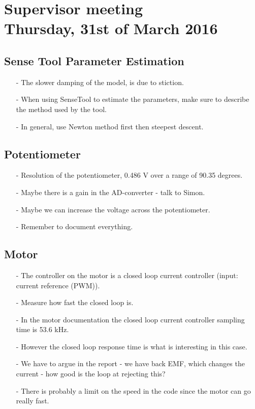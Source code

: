 

\renewcommand\chaptername{KAPITEL}
\renewcommand\contentsname{Indhold}
\renewcommand\figurename{Figur}
\renewcommand\tablename{Tabel}

\section*{Supervisor meeting\\ \small Thursday, 31st of March 2016}

\subsection{Sense Tool Parameter Estimation}
\begin{itemize}
  \item[-] The slower damping of the model, is due to stiction.
  \item[-] When using SenseTool to estimate the parameters, make sure to describe the method used by the tool.
  \item[-] In general, use Newton method first then steepest descent.
\end{itemize}

\subsection{Potentiometer}
\begin{itemize}
  \item[-] Resolution of the potentiometer, 0.486 V over a range of 90.35 degrees.
  \item[-] Maybe there is a gain in the AD-converter - talk to Simon.
  \item[-] Maybe we can increase the voltage across the potentiometer.
  \item[-] Remember to document everything.
\end{itemize}

\subsection{Motor}
\begin{itemize}
  \item[-] The controller on the motor is a closed loop current controller (input: current reference (PWM)).
  \item[-] Measure how fast the closed loop is.
  \item[-] In the motor documentation the closed loop current controller sampling time is 53.6 kHz.
  \item[-] However the closed loop response time is what is interesting in this case.
  \item[-] We have to argue in the report - we have back EMF, which changes the current - how good is the loop at rejecting this?
  \item[-] There is probably a limit on the speed in the code since the motor can go really fast.
\end{itemize}

